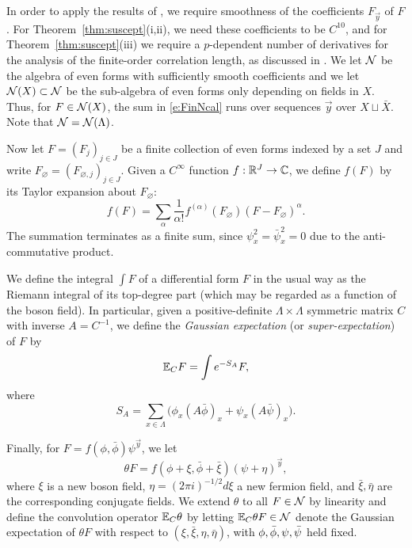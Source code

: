 In order to apply the results of \cite{BBS-saw4-log,BBS-saw4,BSTW-clp}, we require
smoothness of the coefficients $F_{\vec y}$ of $F$.  For Theorem~\ref{thm:suscept}(i,ii),
we need these coefficients to be $C^{10}$, and for Theorem~\ref{thm:suscept}(iii) we require
a $p$-dependent number of derivatives for the analysis of %
the finite-order correlation length,
as discussed in \cite{BSTW-clp}.
We let $\mathcal{N}$ be the algebra of even forms with sufficiently smooth coefficients
and we let $\mathcal{N}(X) \subset \mathcal{N}$ be the sub-algebra of even forms only depending on fields
in $X$. Thus, for $F \in \mathcal{N}(X)$, the sum in \eqref{e:FinNcal} runs over sequences $\vec y$
over $X \sqcup \bar X$.
Note that $\mathcal{N} = \mathcal{N}(\Lambda)$.


Now let $F = (F_j)_{j \in J}$ be a finite collection of even forms
indexed by a set $J$
and write $F_\varnothing = (F_{\varnothing,j})_{j \in J}$.
Given a $C^\infty$ function $f : {\mathbb R}^J \rightarrow \mathbb{C}$, we define
$f(F)$ by its Taylor expansion about $F_\varnothing$:
\begin{equation}
f(F) = \sum_\alpha \frac{1}{\alpha!} f^{(\alpha)}(F_\varnothing) (F - F_\varnothing)^\alpha.
\end{equation}
The summation terminates as a finite sum,
since $\psi_x^2 = \bar\psi_x^2 = 0$ due to the anti-commut\-ative product.

We define the integral
$\int F$
of a differential form $F$ in the usual way
as the Riemann integral of its top-degree part
(which may be regarded as a function
of the boson field).
In particular, given a positive-definite
$\Lambda \times \Lambda$ symmetric matrix $C$
with inverse $A = C^{-1}$,
we define the \emph{Gaussian expectation}
(or \emph{super-expectation}) of $F$ by
\begin{equation}
\lbeq{ExCF}
\Ex_C F = \int e^{-S_A} F,
\end{equation}
where
\begin{equation}
\label{e:action}
S_A = \sum_{x\in\Lambda} \Big(\phi_x (A\bar\phi)_x + \psi_x (A \bar\psi)_x\Big).
\end{equation}

Finally, for $F = f(\phi, \bar\phi) \psi^{\vec y}$,
we let
\begin{equation}
\theta F = f(\phi + \xi, \bar\phi + \bar\xi) (\psi + \eta)^{\vec y},
\end{equation}
where $\xi$ is a new boson field, $\eta = (2\pi i)^{-1/2} d\xi$ a new fermion field,
and $\bar\xi, \bar\eta$ are the corresponding conjugate fields.
We extend $\theta$ to all $F \in \mathcal{N}$ by linearity
and define the convolution operator $\mathbb{E}_C\theta$ by letting
$\mathbb{E}_C\theta F \in \mathcal{N}$ denote the Gaussian expectation of $\theta F$ with respect
to $(\xi, \bar\xi, \eta, \bar\eta)$, with $\phi,\bar\phi,\psi,\bar\psi$ held fixed.


